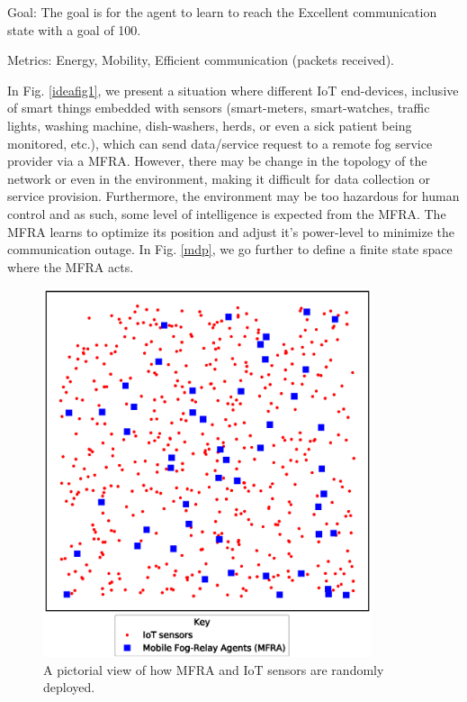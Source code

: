 \documentclass[journal]{IEEEtran}
\begin{document}
Goal: The goal is for the agent to learn to reach the Excellent communication state with a goal of 100.

Metrics: Energy, Mobility, Efficient communication (packets received).


In Fig. \ref{ideafig1}, we present a situation where different IoT end-devices, inclusive of smart things embedded with sensors (smart-meters, smart-watches, traffic lights, washing machine, dish-washers, herds, or even a sick patient being monitored, etc.), which can send data/service request to a remote fog service provider via a MFRA. However, there may be change in the topology of the network or even in the environment, making it difficult for data collection or service provision. Furthermore, the environment may be too hazardous for human control and as such, some level of intelligence is expected from the MFRA. The MFRA learns to optimize its position and adjust it's power-level to minimize the communication outage. In Fig. \ref{mdp}, we go further to define a finite state space where the MFRA acts.

\begin{figure}[!t]
\centering
\includegraphics[width=3.8in]{random_deploy.eps}
\caption{A pictorial view of how MFRA and IoT sensors are randomly deployed.}
\label{random_deploy}
\end{figure}
\end{document}
